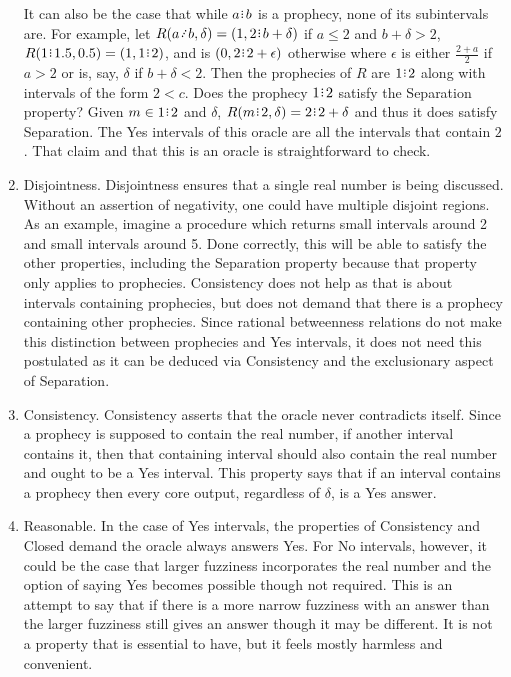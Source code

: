 \documentclass[12pt]{article}
\begin{document}
\begin{enumerate}
    It can also be the case that while $a\rint b$ is a prophecy, none of its subintervals are. For example, let $R(a \lte  b, \delta) = (1, 2\rint  b+ \delta)$ if $a \leq 2$ and $b + \delta > 2$,  $R(1\rint 1.5, 0.5) = (1, 1\rint 2)$, and is $(0, 2\rint 2+\epsilon)$ otherwise where $\epsilon$ is either $\frac{2+a}{2}$ if $a > 2$ or is, say, $\delta$ if $b+\delta < 2$. Then the prophecies of $R$ are  $1\rint 2$ along with intervals of the form $2 \lt  c$. Does the prophecy $1\rint 2$ satisfy the Separation property? Given $m \in 1\rint 2$ and $\delta$, $R(m \rint 2, \delta) = 2\rint 2+\delta$ and thus it does satisfy Separation. The Yes intervals of this oracle are all the intervals that contain $2$. That claim and that this is an oracle is straightforward to check.  
    
 
    \item Disjointness. Disjointness ensures that a single real number is being discussed. Without an assertion of negativity, one could have multiple disjoint regions.  As an example, imagine a procedure which returns small intervals around 2 and small intervals around 5. Done correctly, this will be able to satisfy the other properties, including the Separation property because that property only applies to prophecies. Consistency does not help as that is about intervals containing prophecies, but does not demand that there is a prophecy containing other prophecies.  Since rational betweenness relations do not make this distinction between prophecies and Yes intervals, it does not need this postulated as it can be deduced via Consistency and the exclusionary aspect of Separation. 
    
    \item Consistency. Consistency asserts that the oracle never contradicts itself. Since a prophecy is supposed to contain the real number, if another interval contains it, then that containing interval should also contain the real number and ought to be a Yes interval. This property says that if an interval contains a prophecy then every core output, regardless of $\delta$, is a Yes answer. 

    \item Reasonable. In the case of Yes intervals, the properties of Consistency and Closed demand the oracle always answers Yes. For No intervals, however, it could be the case that larger fuzziness incorporates the real number and the option of saying Yes becomes possible though not required. This is an attempt to say that if there is a more narrow fuzziness with an answer than the larger fuzziness still gives an answer though it may be different. It is not a property that is essential to have, but it feels mostly harmless and convenient. 
    

\end{enumerate}
\end{document}
